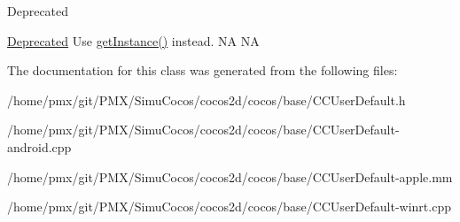 \begin{DoxyRefDesc}{Deprecated}
\item[\hyperlink{deprecated__deprecated000295}{Deprecated}]Use \hyperlink{classUserDefault_a0885d10cb5187584d49d245594a43b8c}{get\+Instance()} instead.  NA  NA \end{DoxyRefDesc}


The documentation for this class was generated from the following files\+:\begin{DoxyCompactItemize}
\item 
/home/pmx/git/\+P\+M\+X/\+Simu\+Cocos/cocos2d/cocos/base/C\+C\+User\+Default.\+h\item 
/home/pmx/git/\+P\+M\+X/\+Simu\+Cocos/cocos2d/cocos/base/C\+C\+User\+Default-\/android.\+cpp\item 
/home/pmx/git/\+P\+M\+X/\+Simu\+Cocos/cocos2d/cocos/base/C\+C\+User\+Default-\/apple.\+mm\item 
/home/pmx/git/\+P\+M\+X/\+Simu\+Cocos/cocos2d/cocos/base/C\+C\+User\+Default-\/winrt.\+cpp\end{DoxyCompactItemize}
